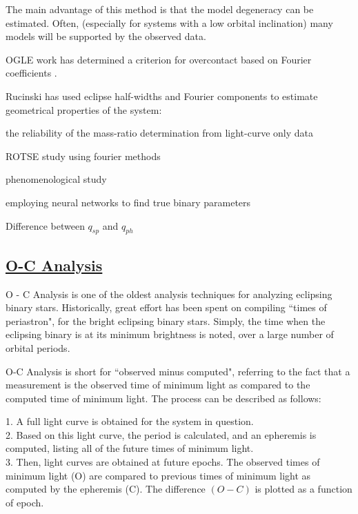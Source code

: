 \documentclass[12pt]{article} %
\numberwithin{equation}{section} %
\begin{document}
The main advantage of this method is that the model degeneracy can be estimated. Often, (especially for systems with a low orbital inclination) many models will be supported by the observed data.

OGLE work has determined a criterion for overcontact based on Fourier coefficients \citep{rucinski1997eclipsing}. \citep{rucinski1993simple}

Rucinski has used eclipse half-widths and Fourier components to estimate geometrical properties of the system:

the reliability of the mass-ratio determination from light-curve only data \citep{hambalek2013reliability}

ROTSE study using fourier methods \citep{coker2013study}

phenomenological study \citep{andronov2012phenomenological}

employing neural networks to find true binary parameters \citep{zeraatgari2015neural}

Difference between $q_{sp}$ and $q_{ph}$ \citep{van1985contribution}

\citep{rucinski1973w} \citep{rucinski1993light} \citep{terrell2005photometric} \citep{hambalek2013}

\subsection[O-C Analysis]{\hyperlink{toc}{O-C Analysis}} \label{sec: O-C Analysis}

O - C Analysis is one of the oldest analysis techniques for analyzing eclipsing binary stars. Historically, great effort has been spent on compiling ``times of periastron", for the bright eclipsing binary stars. Simply, the time when the eclipsing binary is at its minimum brightness is noted, over a large number of orbital periods.

O-C Analysis is short for ``observed minus computed", referring to the fact that a measurement is the observed time of minimum light as compared to the computed time of minimum light. The process can be described as follows:

1. A full light curve is obtained for the system in question. \\
2. Based on this light curve, the period is calculated, and an epheremis is computed, listing all of the future times of minimum light. \\
3. Then, light curves are obtained at future epochs. The observed times of minimum light (O) are compared to previous times of minimum light as computed by the epheremis (C). The difference $(O-C)$ is plotted as a function of epoch. \\
\end{document}
